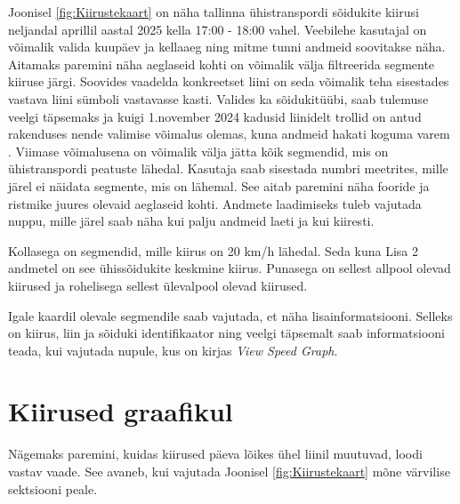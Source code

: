Joonisel \ref{fig:Kiirustekaart} on näha tallinna ühistranspordi sõidukite kiirusi neljandal aprillil aastal 2025 kella 17:00 - 18:00 vahel. Veebilehe kasutajal on võimalik valida kuupäev ja kellaaeg ning mitme tunni andmeid soovitakse näha. Aitamaks paremini näha aeglaseid kohti on võimalik välja filtreerida segmente kiiruse järgi. Soovides vaadelda konkreetset liini on seda võimalik teha sisestades vastava liini sümboli vastavasse kasti. Valides ka sõidukitüübi, saab tulemuse veelgi täpsemaks ja kuigi 1.november 2024 kadusid liinidelt trollid on antud rakenduses nende valimise võimalus olemas, kuna andmeid hakati koguma varem \cite{trollid}. Viimase võimalusena on võimalik välja jätta kõik segmendid, mis on ühistranspordi peatuste lähedal. Kasutaja saab sisestada numbri meetrites, mille järel ei näidata segmente, mis on lähemal. See aitab paremini näha fooride ja ristmike juures olevaid aeglaseid kohti. Andmete laadimiseks tuleb vajutada nuppu, mille järel saab näha kui palju andmeid laeti ja kui kiiresti.

Kollasega on segmendid, mille kiirus on 20 km/h lähedal. Seda kuna Lisa 2 andmetel on see ühissõidukite keskmine kiirus. Punasega on sellest allpool olevad kiirused ja rohelisega sellest ülevalpool olevad kiirused.

Igale kaardil olevale segmendile saab vajutada, et näha lisainformatsiooni. Selleks on kiirus, liin ja sõiduki identifikaator ning veelgi täpsemalt saab informatsiooni teada, kui vajutada nupule, kus on kirjas \textit{View Speed Graph}.

\section{Kiirused graafikul} 

Nägemaks paremini, kuidas kiirused päeva lõikes ühel liinil muutuvad, loodi vastav vaade. See avaneb, kui vajutada Joonisel \ref{fig:Kiirustekaart} mõne värvilise sektsiooni peale.

